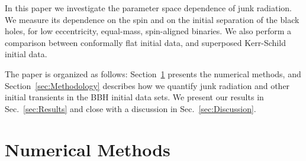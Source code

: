 \documentclass[aps,prd,amsmath,floatfix,twocolumn,superscriptaddress,nofootinbib,showpacs]{revtex4-1}
\theoremstyle{plain}
\theoremstyle{definition}
\begin{document}
In this paper we investigate the parameter space dependence of junk
radiation. We measure its dependence on the spin and on the initial
separation of the black holes, for low eccentricity, equal-mass,
spin-aligned binaries. We also perform a comparison between conformally
flat initial data, and superposed Kerr-Schild initial data.

The paper is organized as follows: 
  Section~\ref{sec:NumericalMethods} presents the numerical methods,
  and Section~\ref{sec:Methodology} describes how we quantify junk
  radiation and other initial transients in the BBH initial data sets.
  We present our results in Sec.~\ref{sec:Results} and close with a discussion in Sec.~\ref{sec:Discussion}.

\section{Numerical Methods}
\label{sec:NumericalMethods}
\end{document}

